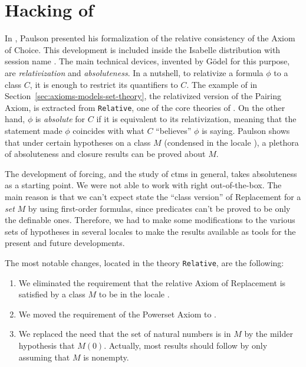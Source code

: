 \section{Hacking of }
\label{sec:hack-constructible}
In \cite{paulson_2003}, Paulson presented his formalization of the
relative consistency of the Axiom of Choice. This development is
included inside the Isabelle distribution with session name
. The main technical devices, invented by
G\"odel for this purpose, are \emph{relativization} and
\emph{absoluteness}. In a nutshell, to relativize a formula $\phi$ to
a class $C$, it is enough to restrict its quantifiers to $C$. The
example of  in
Section~\ref{sec:axioms-models-set-theory}, the relativized version of
the Pairing Axiom, is extracted from \texttt{Relative}, one of the
core theories of . On the other hand, $\phi$
is \emph{absolute} for $C$ if it is equivalent to its relativization,
meaning that the statement made $\phi$ coincides with what $C$
``believes'' $\phi$ is saying. Paulson shows that under certain
hypotheses  on a class $M$ (condensed in the locale ), a plethora of
absoluteness and closure results can be proved about $M$.

The development of forcing, and the study of ctms in general, takes
absoluteness as a starting point. We were not able to work with
 right out-of-the-box. The main reason is that
we can't expect state the ``class version'' of Replacement for a
\emph{set} $M$ by
using first-order formulas, since predicates
 can't
be proved to be only the definable ones. Therefore, we had to make
some modifications to the various sets of hypotheses in several
locales to make the results available as tools for the present and
future developments.


The most notable changes, located in the theory \texttt{Relative}, are
the following:
\begin{enumerate}
\item\label{item:1} We eliminated the requirement that the relative Axiom of Replacement
  is satisfied by a class $M$ to be in the locale . 
\item\label{item:2} We moved the requirement of the Powerset Axiom to . 
\item\label{item:3} We replaced the need that the set of natural numbers is in $M$ by the
  milder hypothesis that $M(0)$. Actually, most results should follow
  by only assuming that $M$ is nonempty.
\end{enumerate}

